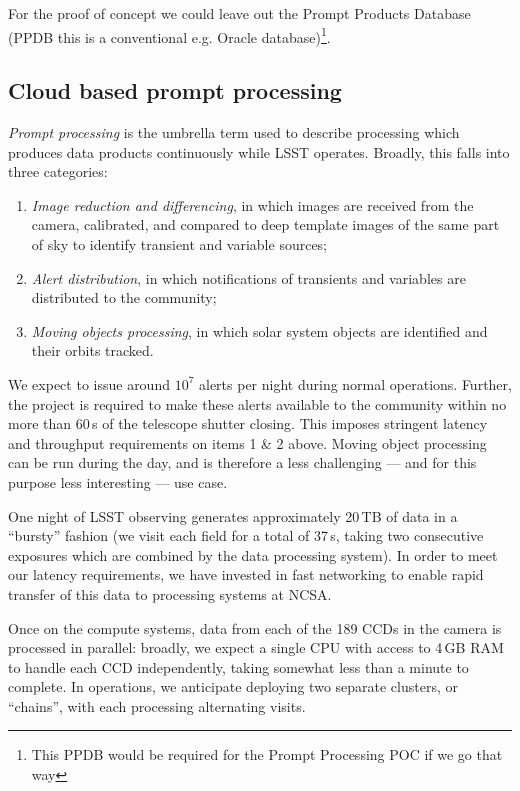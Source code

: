 For the proof of concept we could leave out the Prompt Products Database (PPDB this is a conventional e.g. Oracle database)\footnote {This PPDB would be required for the Prompt Processing POC if we go that way}.

\subsection{Cloud based prompt processing}\label{sect:pp}

\textit{Prompt processing}  is the umbrella term used to describe processing which produces data products continuously while LSST operates.
Broadly, this falls into three categories:

\begin{enumerate}

\item{\textit{Image reduction and differencing}, in which images are received from the camera, calibrated, and compared to deep template images of the same part of sky to identify transient and variable sources;}
\item{\textit{Alert distribution}, in which notifications of transients and variables are distributed to the community;}
\item{\textit{Moving objects processing}, in which solar system objects are identified and their orbits tracked.}

\end{enumerate}

We expect to issue around $10^7$ alerts per night during normal operations.
Further, the project is required to make these alerts available to the community within no more than 60\,s of the telescope shutter closing.
This imposes stringent latency and throughput requirements on items 1 \& 2 above.
Moving object processing can be run during the day, and is therefore a less challenging — and for this purpose less interesting — use case.

One night of LSST observing generates approximately 20\,TB of data in a ``bursty'' fashion (we visit each field for a total of 37\,s, taking two consecutive exposures which are combined by the data processing system).
In order to meet our latency requirements, we have invested in fast networking to enable rapid transfer of this data to processing systems at NCSA.

Once on the compute systems, data from each of the 189 CCDs in the camera is processed in parallel: broadly, we expect a single CPU with access to 4\,GB RAM to handle each CCD independently, taking somewhat less than a minute to complete.
In operations, we anticipate deploying two separate clusters, or ``chains'', with each processing alternating visits.

